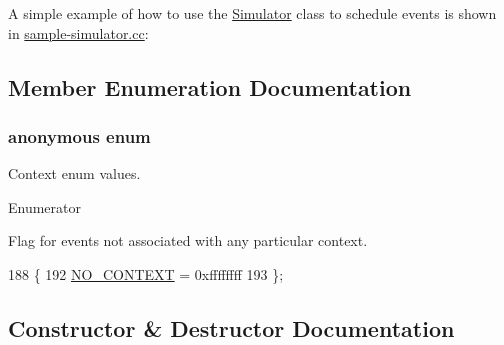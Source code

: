 A simple example of how to use the \hyperlink{classns3_1_1Simulator}{Simulator} class to schedule events is shown in \hyperlink{sample-simulator_8cc}{sample-\/simulator.\+cc}\+: 
\begin{DoxyCodeInclude}
\end{DoxyCodeInclude}
 

\subsection{Member Enumeration Documentation}
\subsubsection[{\texorpdfstring{anonymous enum}{anonymous enum}}]{\setlength{\rightskip}{0pt plus 5cm}anonymous enum}\hypertarget{classns3_1_1Simulator_ab25cc4cd782af44b5843ce7258ecde10}{}\label{classns3_1_1Simulator_ab25cc4cd782af44b5843ce7258ecde10}
Context enum values. \begin{Desc}
\item[Enumerator]\par
\begin{description}
\item[{\em 
N\+O\+\_\+\+C\+O\+N\+T\+E\+XT\hypertarget{classns3_1_1Simulator_ab25cc4cd782af44b5843ce7258ecde10abaefe68ccc9945956c166aaeea2e986e}{}\label{classns3_1_1Simulator_ab25cc4cd782af44b5843ce7258ecde10abaefe68ccc9945956c166aaeea2e986e}
}]Flag for events not associated with any particular context. \end{description}
\end{Desc}

\begin{DoxyCode}
188        \{
192     \hyperlink{classns3_1_1Simulator_ab25cc4cd782af44b5843ce7258ecde10abaefe68ccc9945956c166aaeea2e986e}{NO\_CONTEXT} = 0xffffffff
193   \};
\end{DoxyCode}


\subsection{Constructor \& Destructor Documentation}
